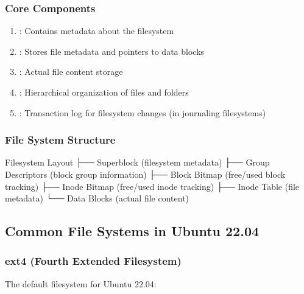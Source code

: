 \documentclass[letterpaper,10pt,english]{sphinxmanual}
\begin{document}
\subsubsection{Core Components}
\label{\detokenize{file-systems:core-components}}\begin{enumerate}
%
\item {} 
\sphinxAtStartPar
{}: Contains metadata about the filesystem

\item {} 
\sphinxAtStartPar
{}: Stores file metadata and pointers to data blocks

\item {} 
\sphinxAtStartPar
{}: Actual file content storage

\item {} 
\sphinxAtStartPar
{}: Hierarchical organization of files and folders

\item {} 
\sphinxAtStartPar
{}: Transaction log for filesystem changes (in journaling filesystems)

\end{enumerate}


\subsubsection{File System Structure}
\label{\detokenize{file-systems:file-system-structure}}
\begin{sphinxVerbatim}[commandchars=\\\{\}]
Filesystem Layout
├── Superblock (filesystem metadata)
├── Group Descriptors (block group information)
├── Block Bitmap (free/used block tracking)
├── Inode Bitmap (free/used inode tracking)
├── Inode Table (file metadata)
└── Data Blocks (actual file content)
\end{sphinxVerbatim}


\subsection{Common File Systems in Ubuntu 22.04}
\label{\detokenize{file-systems:common-file-systems-in-ubuntu-22-04}}

\subsubsection{ext4 (Fourth Extended Filesystem)}
\label{\detokenize{file-systems:ext4-fourth-extended-filesystem}}
\sphinxAtStartPar
The default filesystem for Ubuntu 22.04:
\end{document}
